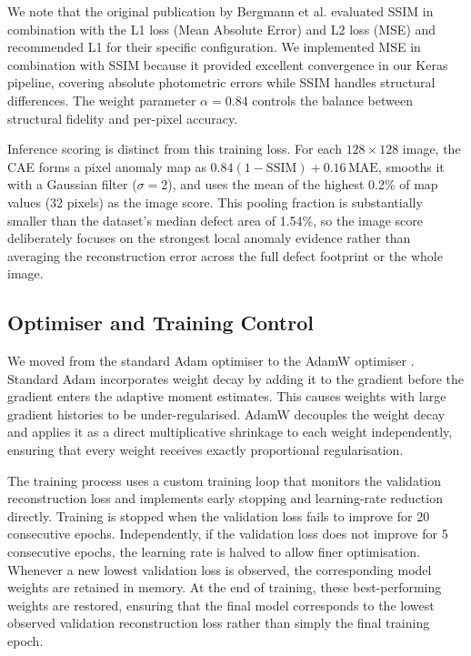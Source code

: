 \documentclass[11pt, a4paper]{article}
\begin{document}
We note that the original publication by Bergmann et al. \cite{bergmann2019ssim} evaluated SSIM in combination with the L1 loss (Mean Absolute Error) and L2 loss (MSE) and recommended L1 for their specific configuration. We implemented MSE in combination with SSIM because it provided excellent convergence in our Keras pipeline, covering absolute photometric errors while SSIM handles structural differences. The weight parameter $\alpha = 0.84$ controls the balance between structural fidelity and per-pixel accuracy.

Inference scoring is distinct from this training loss. For each $128 \times 128$ image, the CAE forms a pixel anomaly map as $0.84(1-\mathrm{SSIM})+0.16\,\mathrm{MAE}$, smooths it with a Gaussian filter ($\sigma=2$), and uses the mean of the highest 0.2\% of map values (32 pixels) as the image score. This pooling fraction is substantially smaller than the dataset's median defect area of 1.54\%, so the image score deliberately focuses on the strongest local anomaly evidence rather than averaging the reconstruction error across the full defect footprint or the whole image.

\subsection{Optimiser and Training Control}

We moved from the standard Adam optimiser to the AdamW optimiser \cite{loshchilov2019adamw}. Standard Adam incorporates weight decay by adding it to the gradient before the gradient enters the adaptive moment estimates. This causes weights with large gradient histories to be under-regularised. AdamW decouples the weight decay and applies it as a direct multiplicative shrinkage to each weight independently, ensuring that every weight receives exactly proportional regularisation.

The training process uses a custom training loop that monitors the validation reconstruction loss and implements early stopping and learning-rate reduction directly. Training is stopped when the validation loss fails to improve for 20 consecutive epochs. Independently, if the validation loss does not improve for 5 consecutive epochs, the learning rate is halved to allow finer optimisation. Whenever a new lowest validation loss is observed, the corresponding model weights are retained in memory. At the end of training, these best-performing weights are restored, ensuring that the final model corresponds to the lowest observed validation reconstruction loss rather than simply the final training epoch.
\end{document}
